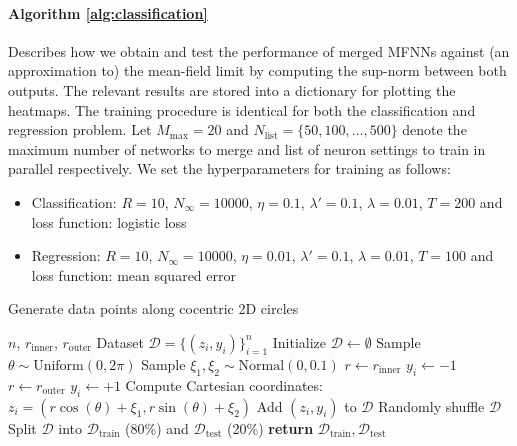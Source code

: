 \paragraph{Algorithm \ref{alg:classification}} Describes how we obtain and test the performance of merged MFNNs against (an approximation to) the mean-field limit by computing the sup-norm between both outputs. The relevant results are stored into a dictionary for plotting the heatmaps. The training procedure is identical for both the classification and regression problem. Let $M_\text{max} = 20$ and $N_\text{list} = \{50, 100, \dots ,500 \}$ denote the maximum number of networks to merge and list of neuron settings to train in parallel respectively. We set the hyperparameters for training as follows:
\begin{itemize}
    \item Classification: $R=10$, $N_\infty=10000$, $\eta = 0.1$, $\lambda' = 0.1$, $\lambda = 0.01$, $T=200$ and loss function: logistic loss
    \item Regression: $R=10$, $N_\infty=10000$, $\eta = 0.01$, $\lambda' = 0.1$, $\lambda = 0.01$, $T=100$ and loss function: mean squared error
\end{itemize}


\begin{algorithm} 
\caption{Generate data points along cocentric 2D circles}\label{alg:circle_data}
\begin{algorithmic}[1]
\REQUIRE $n$, $r_{\text{inner}}$, $r_{\text{outer}}$
\ENSURE Dataset $\mathcal{D} = \{(z_i, y_i)\}_{i=1}^n$
\STATE Initialize $\mathcal{D} \gets \emptyset$
    \STATE Sample $\theta \sim \text{Uniform}(0, 2\pi)$
    \STATE Sample $\xi_1, \xi_2 \sim \text{Normal}(0, 0.1)$
        \STATE $r \gets r_{\text{inner}}$
        \STATE $y_i \gets -1$
    \ELSE
        \STATE $r \gets r_{\text{outer}}$
        \STATE $y_i \gets +1$
    \ENDIF
    \STATE Compute Cartesian coordinates: $z_i = (r \cos(\theta) + \xi_1, r \sin(\theta) + \xi_2)$
    \STATE Add $(z_i, y_i)$ to $\mathcal{D}$
\ENDFOR
\STATE Randomly shuffle $\mathcal{D}$
\STATE Split $\mathcal{D}$ into $\mathcal{D}_{\text{train}}$ (80\%) and $\mathcal{D}_{\text{test}}$ (20\%)
\STATE \textbf{return} $\mathcal{D}_{\text{train}}, \mathcal{D}_{\text{test}}$
\end{algorithmic}
\end{algorithm}

